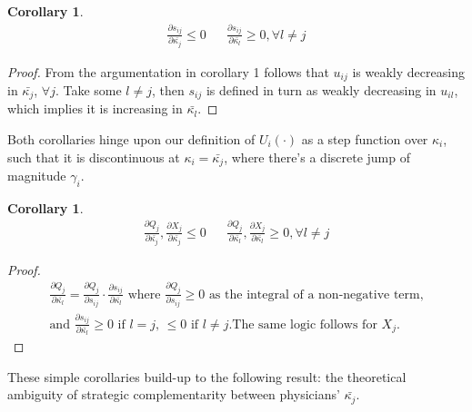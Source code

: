 \documentclass{article}
\newtheorem{corollary}[theorem]{Corollary}
\begin{document}
\begin{corollary}
\begin{align*}
    \frac{\partial s_{ij}}{\partial\bar{\kappa_{j}}} \leq 0 &&  \frac{\partial s_{ij}}{\partial\bar{\kappa_{l}}} \geq 0, \forall l \neq j
\end{align*}   
\end{corollary}

\begin{proof}
From the argumentation in corollary 1 follows that $u_{ij}$ is weakly decreasing in $\bar{\kappa_j}$, $\forall j$. Take some $l \neq j$, then $s_{ij}$ is defined in turn as weakly decreasing in $u_{il}$, which implies it is increasing in $\bar{\kappa_l}$.
\end{proof}

Both corollaries hinge upon our definition of $U_i(\cdot)$ as a step function over $\kappa_i$, such that it is discontinuous at $\kappa_i = \bar{\kappa_j}$, where there's a discrete jump of magnitude  $\gamma_i$.

\begin{corollary}
\begin{align*}
    \frac{\partial Q_{j}}{\partial\bar{\kappa_{j}}},\frac{\partial X_{j}}{\partial\bar{\kappa_{j}}} \leq 0 &&  \frac{\partial Q_{j}}{\partial\bar{\kappa_{l}}}, \frac{\partial X_{j}}{\partial\bar{\kappa_{l}}} \geq 0, \forall l \neq j
\end{align*}
\end{corollary}

\begin{proof}
\begin{align*}
\frac{\partial Q_{j}}{\partial\bar{\kappa_{l}}} = \frac{\partial Q_{j}}{\partial s_{ij}} \cdot \frac{\partial s_{ij}}{\partial\bar{\kappa_{l}}} \text{ where $\frac{\partial Q_{j}}{\partial s_{ij}} \geq 0$ as the integral of a non-negative term,} \\ \text{and $\frac{\partial s_{ij}}{\partial\bar{\kappa_{l}}} \geq 0$ if $l = j$, $\leq 0$ if $l \neq  j$.}  \text{The same logic follows for $X_j$.}
\end{align*}
\end{proof}

These simple corollaries build-up to the following result: the theoretical ambiguity of strategic complementarity between physicians' $\bar{\kappa_j}$.
\end{document}
